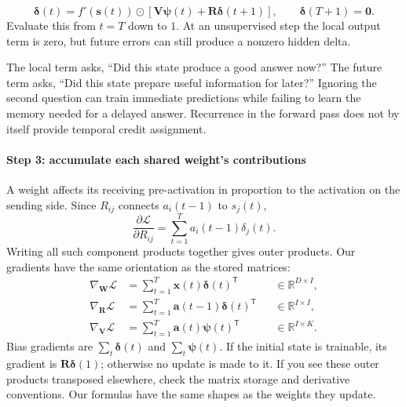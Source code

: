\documentclass[11pt, oneside]{book}
\newcommand{\R}{\mathbb{R}}
\newcommand{\T}{^{\mathsf{T}}}           %
\newcommand{\loss}{\mathcal{L}}          %
\newcommand{\params}{\boldsymbol{\theta}}   %
\begin{document}
\begin{thmbox}[title={The backward recurrence}]
\begin{equation}
 \boldsymbol{\delta}(t)=f'(\mathbf{s}(t))\odot
 \left[\mathbf{V}\boldsymbol{\psi}(t)
       +\mathbf{R}\boldsymbol{\delta}(t+1)\right],
 \qquad \boldsymbol{\delta}(T+1)=\mathbf{0}.
 \label{eq:bptt-delta}
\end{equation}
Evaluate this from $t=T$ down to $1$. At an unsupervised step the local output term is zero, but future errors can still produce a nonzero hidden delta.
\end{thmbox}

\begin{intbox}[title={A hidden unit receives two kinds of feedback}]
The local term asks, ``Did this state produce a good answer now?'' The future term asks, ``Did this state prepare useful information for later?'' Ignoring the second question can train immediate predictions while failing to learn the memory needed for a delayed answer. Recurrence in the forward pass does not by itself provide temporal credit assignment.
\end{intbox}

\paragraph{Step 3: accumulate each shared weight's contributions} A weight affects its receiving pre-activation in proportion to the activation on the sending side. Since $R_{ij}$ connects $a_i(t-1)$ to $s_j(t)$,
\[
 \frac{\partial\loss}{\partial R_{ij}}
     =\sum_{t=1}^T a_i(t-1)\delta_j(t).
\]
Writing all such component products together gives outer products. Our gradients have the same orientation as the stored matrices:
\begin{align}
 \nabla_{\mathbf{W}}\loss&=\sum_{t=1}^T\mathbf{x}(t)\boldsymbol{\delta}(t)\T
       &&\in\R^{D\times I},\label{eq:grad-w}\\
 \nabla_{\mathbf{R}}\loss&=\sum_{t=1}^T\mathbf{a}(t-1)\boldsymbol{\delta}(t)\T
       &&\in\R^{I\times I},\label{eq:grad-r}\\
 \nabla_{\mathbf{V}}\loss&=\sum_{t=1}^T\mathbf{a}(t)\boldsymbol{\psi}(t)\T
       &&\in\R^{I\times K}.\label{eq:grad-v}
\end{align}
Bias gradients are $\sum_t\boldsymbol{\delta}(t)$ and $\sum_t\boldsymbol{\psi}(t)$. If the initial state is trainable, its gradient is $\mathbf{R}\boldsymbol{\delta}(1)$; otherwise no update is made to it. If you see these outer products transposed elsewhere, check the matrix storage and derivative conventions. Our formulas have the same shapes as the weights they update.
\end{document}
